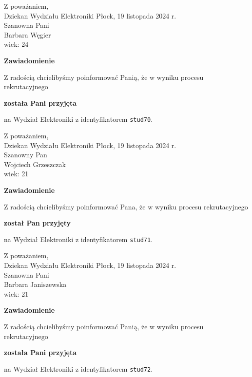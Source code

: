 \documentclass[12pt,a4paper]{article}
\begin{document}
\noindent
Z poważaniem,\\
Dziekan
Wydziału Elektroniki
\newpage
\hfill Płock, 19 listopada 2024 r.\\ 
\noindent 
Szanowna Pani \\
Barbara Węgier \\
wiek: 24

\bigskip

\begin{center}
{\Large\textbf{Zawiadomienie}}
\end{center}
\bigskip
Z radością chcielibyśmy poinformować Panią, że w wyniku procesu rekrutacyjnego
\begin{center}
\textsf{\textbf{została Pani przyjęta}} 
\end{center}
na Wydział Elektroniki z identyfikatorem \verb|stud70|.
\vspace{2cm}

\noindent
Z poważaniem,\\
Dziekan
Wydziału Elektroniki
\newpage
\hfill Płock, 19 listopada 2024 r.\\ 
\noindent 
Szanowny Pan \\
Wojciech Grzeszczak \\
wiek: 21

\bigskip

\begin{center}
{\Large\textbf{Zawiadomienie}}
\end{center}
\bigskip
Z radością chcielibyśmy poinformować Pana, że w wyniku procesu rekrutacyjnego
\begin{center}
\textsf{\textbf{został Pan przyjęty}} 
\end{center}
na Wydział Elektroniki z identyfikatorem \verb|stud71|.
\vspace{2cm}

\noindent
Z poważaniem,\\
Dziekan
Wydziału Elektroniki
\newpage
\hfill Płock, 19 listopada 2024 r.\\ 
\noindent 
Szanowna Pani \\
Barbara Janiszewska \\
wiek: 21

\bigskip

\begin{center}
{\Large\textbf{Zawiadomienie}}
\end{center}
\bigskip
Z radością chcielibyśmy poinformować Panią, że w wyniku procesu rekrutacyjnego
\begin{center}
\textsf{\textbf{została Pani przyjęta}} 
\end{center}
na Wydział Elektroniki z identyfikatorem \verb|stud72|.
\vspace{2cm}
\end{document}
